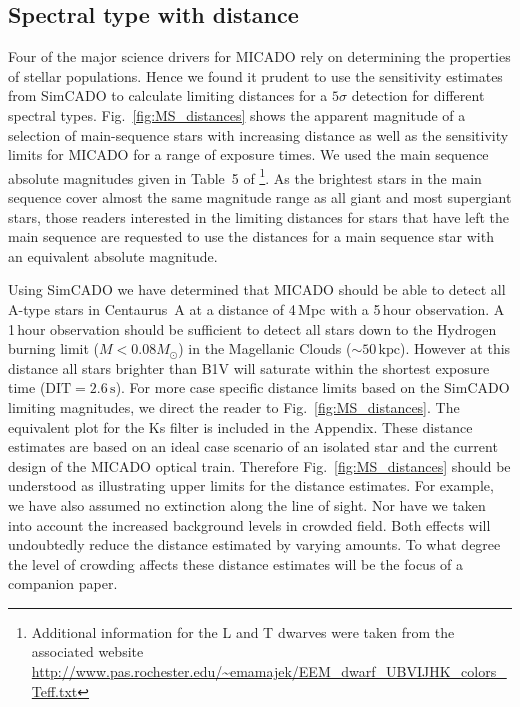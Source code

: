 \subsection{Spectral type with distance}


Four of the major science drivers for MICADO rely on determining the properties of stellar populations. Hence we found it prudent to use the sensitivity estimates from SimCADO to calculate limiting distances for a $5\sigma$ detection for different spectral types. Fig.~\ref{fig:MS_distances} shows the apparent magnitude of a selection of main-sequence stars with increasing distance as well as the sensitivity limits for MICADO for a range of exposure times. 
We used the main sequence absolute magnitudes given in Table~5 of \citet{pecaut2013}\footnote{Additional information for the L and T dwarves \citep[not reported by][]{pecaut2013} were taken from the associated website \url{http://www.pas.rochester.edu/~emamajek/EEM_dwarf_UBVIJHK_colors_Teff.txt}}. As the brightest stars in the main sequence cover almost the same magnitude range as all giant and most supergiant stars, those readers interested in the limiting distances for stars that have left the main sequence are requested to use the distances for a main sequence star with an equivalent absolute magnitude. 

Using SimCADO we have determined that MICADO should be able to detect all A-type stars in Centaurus~A at a distance of 4\,Mpc with a 5\,hour observation. A 1\,hour observation should be sufficient to detect all stars down to the Hydrogen burning limit ($M < 0.08 M_{\odot}$) in the Magellanic Clouds ($\sim 50\,\mathrm{kpc}$). However at this distance all stars brighter than B1V will saturate within the shortest exposure time ($\mathrm{DIT} =2.6\,\mathrm{s}$). For more case specific distance limits based on the SimCADO limiting magnitudes, we direct the reader to Fig.~\ref{fig:MS_distances}. The equivalent plot for the Ks filter is included in the Appendix. These distance estimates are based on an ideal case scenario of an isolated star and the current design of the MICADO optical train. Therefore Fig.~\ref{fig:MS_distances} should be understood as illustrating upper limits for the distance estimates. For example, we have also assumed no extinction along the line of sight. Nor have we taken into account the increased background levels in crowded field. Both effects will undoubtedly reduce the distance estimated by varying amounts. To what degree the level of crowding affects these distance estimates will be the focus of a companion paper.


